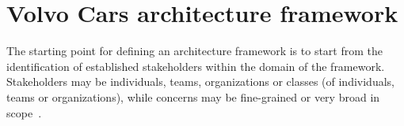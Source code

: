 
\section{Volvo Cars architecture framework}\label{sec:VCGAF}

The starting point for defining an architecture framework is to start from the identification of established stakeholders within the domain of the framework. Stakeholders may be individuals, teams,
organizations or classes (of individuals, teams or organizations), while concerns may be fine-grained or very broad in scope~\cite{Emery-Hilliard:2009}. 



